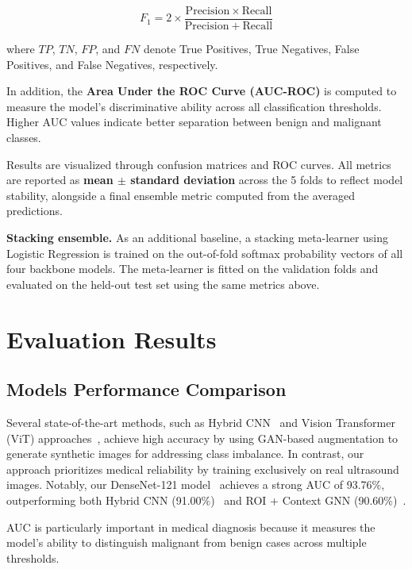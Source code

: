 \documentclass[conference]{IEEEtran}
\begin{document}
\begin{equation}
  F_1 = 2 \times \frac{\mathrm{Precision} \times \mathrm{Recall}}{\mathrm{Precision} + \mathrm{Recall}}
\end{equation}

where $TP$, $TN$, $FP$, and $FN$ denote True Positives, True Negatives, False Positives, and
False Negatives, respectively.

In addition, the \textbf{Area Under the ROC Curve (AUC-ROC)} is computed to measure the
model's discriminative ability across all classification thresholds. Higher AUC values indicate
better separation between benign and malignant classes.

Results are visualized through confusion matrices and ROC curves. All metrics are reported as
\textbf{mean $\pm$ standard deviation} across the 5 folds to reflect model stability, alongside
a final ensemble metric computed from the averaged predictions.

\textbf{Stacking ensemble.} As an additional baseline, a stacking meta-learner using
Logistic Regression is trained on the out-of-fold softmax probability vectors of all four
backbone models. The meta-learner is fitted on the validation folds and evaluated on the
held-out test set using the same metrics above.


\section{Evaluation Results}

\subsection{Models Performance Comparison}

Several state-of-the-art methods, such as Hybrid CNN~\cite{bahmane2025hybrid} and Vision
Transformer (ViT) approaches~\cite{sujini2025automated}, achieve high accuracy by using
GAN-based augmentation to generate synthetic images for addressing class imbalance. In contrast,
our approach prioritizes medical reliability by training exclusively on real ultrasound images.
Notably, our DenseNet-121 model~\cite{Huang2017DenseNet} achieves a strong AUC of 93.76\%,
outperforming both Hybrid CNN (91.00\%)~\cite{bahmane2025hybrid} and ROI + Context GNN
(90.60\%)~\cite{yavuz2026roi}.

AUC is particularly important in medical diagnosis because it measures the model's ability to
distinguish malignant from benign cases across multiple thresholds.
\end{document}
